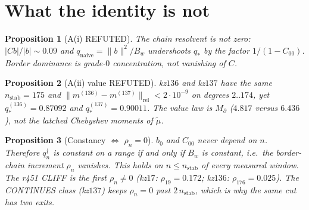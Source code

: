 \documentclass[11pt]{article}
\newtheorem{prop}{Proposition}
\begin{document}
\begin{center}
\end{center}

\section{What the identity is not}\label{sec:not}

\begin{prop}[A(i) REFUTED]\label{prop:ai}
The chain resolvent is not zero:
$|Cb|/|b|\sim 0.09$ and
$q_{\mathrm{naive}}=\|b\|^2/B_w$ undershoots
$q_*$ by the factor $1/(1-C_{00})$.
Border dominance is grade-$0$ concentration,
not vanishing of $C$.
\end{prop}

\begin{prop}[A(ii) value REFUTED]\label{prop:aii}
kz$136$ and kz$137$ have the same
$n_{\mathrm{stab}}=175$ and
$\|m^{(136)}-m^{(137)}\|_{\mathrm{rel}}<2\cdot10^{-9}$
on degrees $2..174$, yet
$q_*^{(136)}=0.87092$ and
$q_*^{(137)}=0.90011$.
The value law is $M_\partial$
($4.817$ versus $6.436$), not the latched
Chebyshev moments of $\tilde\mu$.
\end{prop}

\begin{prop}[Constancy $\Leftrightarrow$ $\rho_n=0$]\label{prop:rho}
$b_0$ and $C_{00}$ never depend on $n$.
Therefore $q^{\dagger}_n$ is constant on a
range if and only if $B_w$ is constant, i.e.\
the border-chain increment $\rho_n$ vanishes.
This holds on $n\le n_{\mathrm{stab}}$ of
every measured window.
The r451 CLIFF is the first $\rho_n\neq 0$
(kz$17$: $\rho_{19}=0.172$;
kz$136$: $\rho_{176}=0.025$).
The CONTINUES class (kz$137$) keeps
$\rho_n=0$ past $2\,n_{\mathrm{stab}}$,
which is why the same cut has two exits.
\end{prop}
\end{document}
